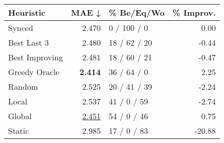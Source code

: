 \begin{tabular}{lrlr}
\toprule
\textbf{Heuristic} & \textbf{MAE ↓} & \textbf{\% Be/Eq/Wo} & \textbf{\% Improv.} \\
\midrule
            Synced &          2.470 &          0 / 100 / 0 &                0.00 \\
\midrule
       Best Last 3 &          2.480 &         18 / 62 / 20 &               -0.44 \\
    Best Improving &          2.481 &         18 / 60 / 21 &               -0.47 \\
\addlinespace
     Greedy Oracle &          \textbf{2.414} &          36 / 64 / 0 &                2.25 \\
            Random &          2.525 &         20 / 41 / 39 &               -2.24 \\
\midrule
             Local &          2.537 &          41 / 0 / 59 &               -2.74 \\
            Global &          \underline{2.451} &          54 / 0 / 46 &                0.75 \\
\midrule
            Static &          2.985 &          17 / 0 / 83 &              -20.88 \\
\bottomrule
\end{tabular}

\label{tab:hr_non_lr05_le1_bs4_Summary}
